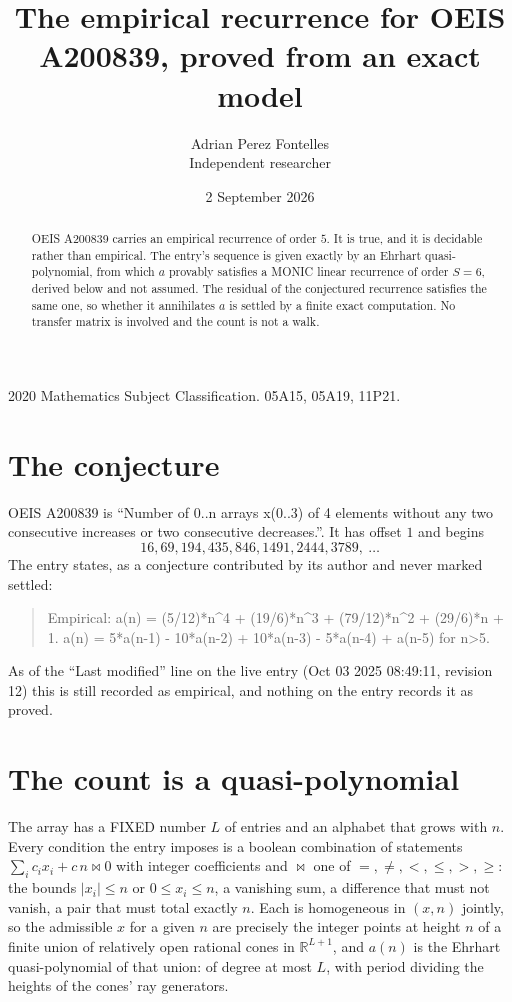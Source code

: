 \documentclass[11pt,a4paper]{article}
\title{The empirical recurrence for OEIS A200839, proved from an exact model}
\author{Adrian Perez Fontelles\\ \small Independent researcher}
\date{2 September 2026}
\theoremstyle{plain}
\theoremstyle{definition}
\begin{document}
\maketitle

\begin{abstract}
OEIS A200839 carries an empirical recurrence of order $5$. It is true, and it is
decidable rather than empirical. The entry's sequence is given exactly by an Ehrhart quasi-polynomial, from
which $a$ provably satisfies a MONIC linear recurrence of order $S=6$, derived below and not
assumed. The residual of the conjectured recurrence satisfies the same one, so whether it
annihilates $a$ is settled by a finite exact computation. No transfer matrix is involved and
the count is not a walk.
\end{abstract}

\noindent\small 2020 Mathematics Subject Classification. 05A15, 05A19, 11P21.\normalsize

\section{The conjecture}

OEIS A200839 is ``Number of 0..n arrays x(0..3) of 4 elements without any two consecutive increases or two consecutive decreases.''. It has offset $1$ and begins
\[
16, 69, 194, 435, 846, 1491, 2444, 3789,\ \dots
\]
The entry states, as a conjecture contributed by its author and never marked settled:
\begin{quote}
Empirical: a(n) = (5/12)*n\^{}4 + (19/6)*n\^{}3 + (79/12)*n\^{}2 + (29/6)*n + 1. a(n) = 5*a(n-1) - 10*a(n-2) + 10*a(n-3) - 5*a(n-4) + a(n-5) for n>5.
\end{quote}
As of the ``Last modified'' line on the live entry (Oct 03 2025 08:49:11, revision 12)
this is still recorded as empirical, and nothing on the entry records it as proved.

\section{The count is a quasi-polynomial}

The array has a FIXED number $L$ of entries and an alphabet that grows with $n$. Every
condition the entry imposes is a boolean combination of statements
$\sum_i c_ix_i + c\,n \bowtie 0$ with integer coefficients and $\bowtie$ one of
$=,\ne,<,\le,>,\ge$: the bounds $|x_i|\le n$ or $0\le x_i\le n$, a vanishing sum, a difference
that must not vanish, a pair that must total exactly $n$. Each is homogeneous in $(x,n)$
jointly, so the admissible $x$ for a given $n$ are precisely the integer points at height $n$
of a finite union of relatively open rational cones in $\mathbb{R}^{L+1}$, and $a(n)$ is
the Ehrhart quasi-polynomial of that union: of degree at most $L$, with period dividing the
heights of the cones' ray generators.
\end{document}
